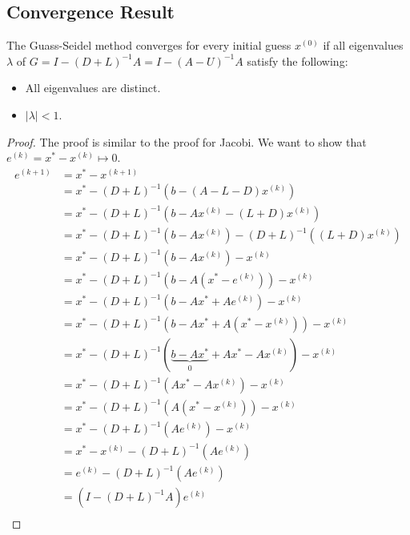 \documentclass[letterpaper]{article}
\newcommand{\0}{\mathbf{0}}
\begin{document}
\subsection{Convergence Result}
The Guass-Seidel method converges for every initial guess $x^{(0)}$ if all eigenvalues $\lambda$ of $G = I - (D + L)^{-1} A = I - (A - U)^{-1} A$ satisfy the following: 
\begin{itemize}
    \item All eigenvalues are distinct. 
    \item $|\lambda| < 1$. 
\end{itemize}
\begin{proof}
    The proof is similar to the proof for Jacobi. We want to show that $e^{(k)} = x^* - x^{(k)} \mapsto 0$. 
    \begin{equation*}
        \begin{aligned}
            e^{(k + 1)} &= x^{*} - x^{(k + 1)} \\ 
                &= x^* - (D + L)^{-1}(b - (A - L - D)x^{(k)}) \\
                &= x^* - (D + L)^{-1}(b - Ax^{(k)} - (L + D)x^{(k)}) \\  
                &= x^* - (D + L)^{-1}(b - Ax^{(k)}) - (D + L)^{-1}((L + D)x^{(k)}) \\ 
                &= x^* - (D + L)^{-1}(b - Ax^{(k)}) - x^{(k)} \\ 
                &= x^* - (D + L)^{-1}(b - A(x^* - e^{(k)})) - x^{(k)} \\ 
                &= x^* - (D + L)^{-1}(b - Ax^* + Ae^{(k)}) - x^{(k)} \\  
                &= x^* - (D + L)^{-1}(b - Ax^* + A(x^* - x^{(k)})) - x^{(k)} \\ 
                &= x^* - (D + L)^{-1}(\underbrace{b - Ax^*}_{0} + Ax^* - Ax^{(k)}) - x^{(k)} \\ 
                &= x^* - (D + L)^{-1}(Ax^* - Ax^{(k)}) - x^{(k)} \\ 
                &= x^* - (D + L)^{-1}(A(x^* - x^{(k)})) - x^{(k)} \\ 
                &= x^* - (D + L)^{-1}(Ae^{(k)}) - x^{(k)} \\ 
                &= x^* - x^{(k)} - (D + L)^{-1}(Ae^{(k)}) \\ 
                &= e^{(k)} - (D + L)^{-1}(Ae^{(k)}) \\ 
                &= (I - (D + L)^{-1}A) e^{(k)} \\ 
        \end{aligned}

\end{equation*}
\end{proof}
\end{document}
